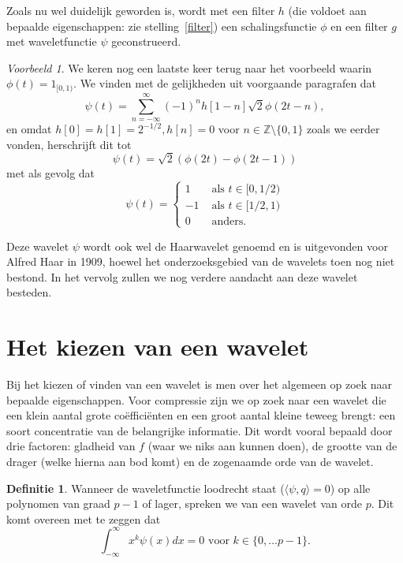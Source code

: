 \documentclass[11pt]{uvamath}
\newcommand{\Z}{\mathbb{Z}}
\theoremstyle{plain}
\theoremstyle{definition}
\newtheorem{definitie}[stelling]{Definitie}
\theoremstyle{remark}
\newtheorem*{voorbeeld}{Voorbeeld}
\begin{document}
Zoals nu wel duidelijk geworden is, wordt met een filter $h$ (die voldoet aan bepaalde eigenschappen: zie stelling~\ref{filter}) een schalingsfunctie $\phi$ en een filter $g$ met waveletfunctie $\psi$ geconstrueerd.

\begin{voorbeeld}
  We keren nog een laatste keer terug naar het voorbeeld waarin $\phi(t) = 1_{[0,1)}$. We vinden met de gelijkheden uit voorgaande paragrafen dat
    \[
    \psi\left(t\right) = \sum_{n=-\infty}^{\infty} (-1)^{n}h[1-n] \sqrt{2}\phi(2t-n),
    \]
    en omdat $h[0] = h[1] = 2^{-1/2}, h[n] = 0$ voor $n \in \Z \setminus \{0,1\}$ zoals we eerder vonden, herschrijft dit tot
    \[
    \psi\left(t\right) = \sqrt{2}\left(\phi(2t) - \phi(2t - 1)\right)
    \]
    met als gevolg dat
    \[
    \psi(t) = \begin{cases} 1 & \text{ als } t \in [0,1/2) \\ -1 & \text{ als } t \in [1/2,1) \\ 0 & \text{ anders.} \end{cases}
    \]

    Deze wavelet $\psi$ wordt ook wel de Haarwavelet genoemd en is uitgevonden voor Alfred Haar in 1909, hoewel het onderzoeksgebied van de wavelets toen nog niet bestond. In het vervolg zullen we nog verdere aandacht aan deze wavelet besteden.
\end{voorbeeld}

\section{Het kiezen van een wavelet}
Bij het kiezen of vinden van een wavelet is men over het algemeen op zoek naar bepaalde eigenschappen. Voor compressie zijn we op zoek naar een wavelet die een klein aantal grote co\"effici\"enten en een groot aantal kleine teweeg brengt: een soort concentratie van de belangrijke informatie. Dit wordt vooral bepaald door drie factoren: gladheid van $f$ (waar we niks aan kunnen doen), de grootte van de drager (welke hierna aan bod komt) en de zogenaamde orde van de wavelet.

\begin{definitie}
  Wanneer de waveletfunctie loodrecht staat ($\langle \psi, q\rangle = 0$) op alle polynomen van graad $p-1$ of lager, spreken we van een wavelet van orde $p$. Dit komt overeen met te zeggen dat
  \[
  \int_{-\infty}^\infty x^k \psi(x) dx = 0 \text{ voor } k \in \{ 0, \ldots p-1 \}.
  \]
\end{definitie}
\end{document}

